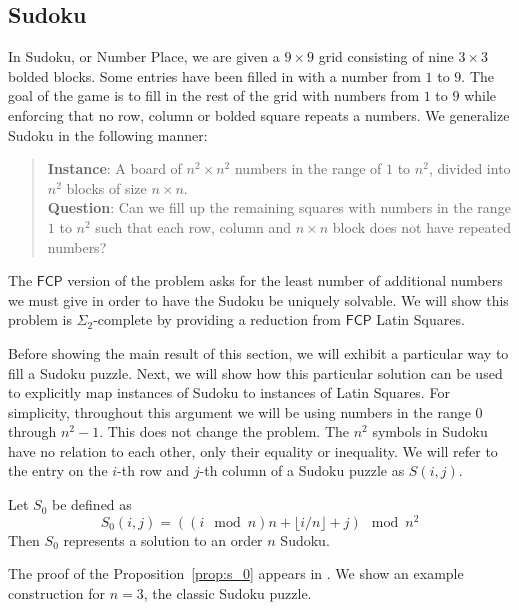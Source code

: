 \documentclass[runningheads,a4paper]{llncs}
\begin{document}
\subsection{Sudoku}

In Sudoku, or Number Place, we are given a $9 \times 9$ grid consisting of nine $3 \times 3$ bolded blocks. Some entries have been filled in with a number from $1$ to $9$. The goal of the game is to fill in the rest of the grid with numbers from $1$ to $9$ while enforcing that no row, column or bolded square repeats a numbers. We generalize Sudoku in the following manner:

\begin{quote}
\textbf{Instance}: A board of $n^2 \times n^2$ numbers in the range of $1$ to $n^2$, divided into $n^2$ blocks of size $n \times n$.\\
\textbf{Question}: Can we fill up the remaining squares with numbers in the range $1$ to $n^2$ such that each row, column and $n \times n$ block does not have repeated numbers?
\end{quote}

The $\mathsf{FCP}$ version of the problem asks for the least number of additional numbers we must give in order to have the Sudoku be uniquely solvable. We will show this problem is $\Sigma_2$-complete by providing a reduction from $\mathsf{FCP}$ Latin Squares. 

Before showing the main result of this section, we will exhibit a particular way to fill a Sudoku puzzle. Next, we will show how this particular solution can be used to explicitly map instances of Sudoku to instances of Latin Squares. For simplicity, throughout this argument we will be using numbers in the range $0$ through $n^2 - 1$. This does not change the problem. The $n^2$ symbols in Sudoku have no relation to each other, only their equality or inequality. We will refer to the entry on the $i$-th row and $j$-th column of a Sudoku puzzle as $S(i,j)$.

\begin{proposition}
\label{prop:s_0}
Let $S_0$ be defined as
\[ S_0 (i,j) = ((i \mod n) n + \lfloor i/n \rfloor + j) \mod n^2 \]
Then $S_0$ represents a solution to an order $n$ Sudoku.
\end{proposition}

The proof of the Proposition~\ref{prop:s_0} appears in \cite{takayaki2003complexity}. We show an example construction for $n=3$, the classic Sudoku puzzle.
\end{document}
